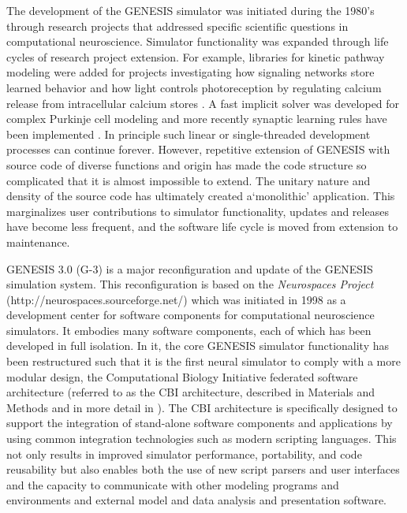 \documentclass[10pt]{article}
\begin{document}
The development of the GENESIS simulator was initiated during
the 1980's through research projects that addressed specific
scientific questions in computational neuroscience. Simulator functionality was
expanded through life cycles of research project extension.
For example, libraries for kinetic pathway modeling were added for
projects investigating how signaling networks store learned
behavior \cite{bhalla99:_emerg} and how light controls photoreception by regulating calcium release from
intracellular calcium stores \cite{blackwell00:_eviden_distin_light_induc_calcium}.
A fast implicit solver was developed for
complex Purkinje cell modeling \cite{deschutter94:_purkin_i,
  deschutter94:_purkin_ii} and more recently synaptic learning rules
have been
implemented \cite{guenay08:_chann_densit_distr_explain_spikin}.  In
principle such linear or single-threaded development processes can
continue forever.  However, repetitive extension of GENESIS
with source code of diverse functions and origin has
made the code structure so complicated that it is almost impossible to extend.  The unitary nature and density of
the source code has ultimately created a`monolithic' application.
This marginalizes user contributions to simulator functionality, updates and releases have become less frequent,
and the software life cycle is moved from extension to maintenance.


GENESIS 3.0 (G-3) is a major reconfiguration and update of the GENESIS
simulation system.  This reconfiguration is based on the {\it Neurospaces Project} (http://neurospaces.sourceforge.net/) which was initiated in 1998 as a development center for software components for computational neuroscience simulators. It embodies many software components, each of which has been developed in full isolation. In it, the core GENESIS simulator functionality has been
restructured such that it is the first neural simulator to comply with a more modular design, the Computational 
Biology Initiative federated software architecture (referred to as the CBI
 architecture, described in Materials and Methods and in more detail in \cite{cornelis11b}).
The CBI
architecture is specifically designed to support
the integration of stand-alone software components and applications by
using common integration technologies such as modern scripting
languages. This not only results in
improved simulator performance, portability, and code reusability but also enables both the
use of new script parsers and user interfaces and the capacity
to communicate with other modeling programs and environments and external model and data analysis and presentation software.
\end{document}
